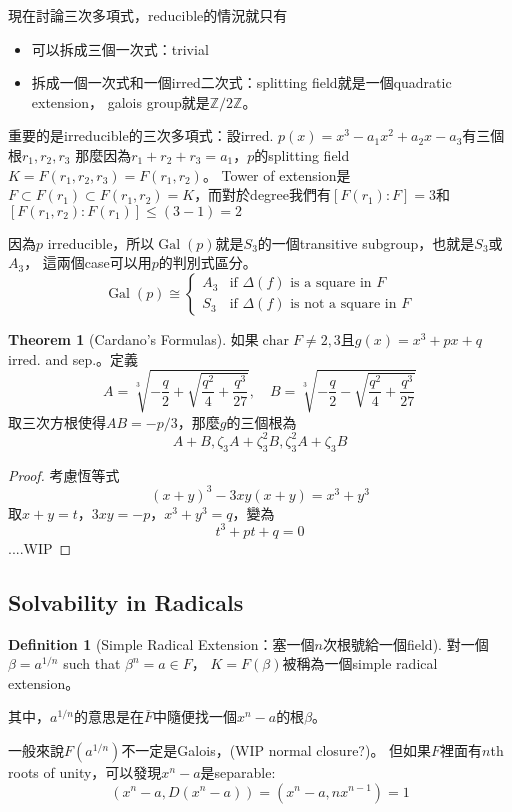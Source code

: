 \documentclass[12pt]{article}
\theoremstyle{definition}
\newtheorem{thm}{Theorem}
\newtheorem{dfn}{Definition}
\newcommand{\ZZ}{\mathbb Z}
\newcommand{\cbrt}[1]{\sqrt[3]{#1}}
\DeclareMathOperator{\Char}{char}
\DeclareMathOperator{\Gal}{Gal}
\begin{document}
現在討論三次多項式，reducible的情況就只有
\begin{itemize}
	\item 可以拆成三個一次式：trivial
	\item 拆成一個一次式和一個irred二次式：splitting field就是一個quadratic extension，
	galois group就是$\ZZ/2\ZZ$。
\end{itemize}
重要的是irreducible的三次多項式：設irred. $p(x)=x^3-a_1 x^2+a_2 x-a_3$有三個根$r_1,r_2,r_3$
那麼因為$r_1+r_2+r_3=a_1$，$p$的splitting field $K=F(r_1,r_2,r_3)=F(r_1,r_2)$。
Tower of extension是$F\subset F(r_1) \subset F(r_1,r_2)=K$，而對於degree我們有$[F(r_1):F]=3$和$[F(r_1,r_2):F(r_1)]\le (3-1)=2$

因為$p$ irreducible，所以$\Gal(p)$就是$S_3$的一個transitive subgroup，也就是$S_3$或$A_3$，
這兩個case可以用$p$的判別式區分。
\[
	\Gal(p) \cong
	\begin{cases}
		A_3 & \text{if } \Delta(f) \text{ is a square in }F\\
		S_3 & \text{if } \Delta(f) \text{ is not a square in }F
	\end{cases}
\]

\begin{thm}[Cardano's Formulas]
	如果$\Char{F}\neq 2,3$且$g(x)=x^3+px+q$ irred. and sep.。定義
	\[
		A=\cbrt{-\frac{q}{2} + \sqrt{\frac{q^2}{4} + \frac{q^3}{27}}},\quad
		B=\cbrt{-\frac{q}{2} - \sqrt{\frac{q^2}{4} + \frac{q^3}{27}}} 
	\]
	取三次方根使得$AB=-p/3$，那麼$g$的三個根為
	\[
	A+B, \zeta_3 A+\zeta_3^2 B, \zeta_3^2 A+\zeta_3 B	
	\]
\end{thm}

\begin{proof}
	考慮恆等式
	\[(x+y)^3-3xy(x+y)=x^3+y^3\]
	取$x+y=t$，$3xy=-p$，$x^3+y^3=q$，變為
	\[t^3+pt+q=0\]
	....WIP
\end{proof}

\subsection{Solvability in Radicals}

\begin{dfn}[Simple Radical Extension：塞一個$n$次根號給一個field]
	對一個$\beta=a^{1/n}$ such that $\beta^n=a\in F$，
	$K=F(\beta)$被稱為一個simple radical extension。
\end{dfn}
其中，$a^{1/n}$的意思是在$\bar{F}$中隨便找一個$x^n-a$的根$\beta$。

一般來說$F(a^{1/n})$不一定是Galois，(WIP normal closure?)。
但如果$F$裡面有$n$th roots of unity，可以發現$x^n-a$是separable:
\[(x^n-a, D(x^n-a))=(x^n-a, nx^{n-1})=1\]
\end{document}
